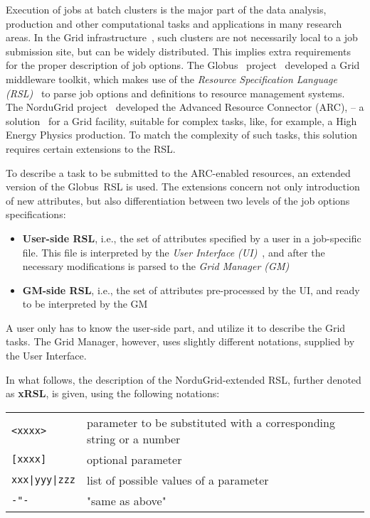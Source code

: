\documentclass{book}
\newcommand{\globus}{Globus\textsuperscript{\textregistered}}
\begin{document}
  Execution of jobs at batch clusters is the major part of the data
  analysis, production and other computational tasks and applications
  in many research areas. In the Grid infrastructure~\cite{grid}, such
  clusters are not necessarily local to a job submission site, but can
  be widely distributed. This implies extra requirements for the
  proper description of job options. The \globus\ 
  project~\cite{globus} developed a Grid middleware toolkit, which
  makes use of the \textit{Resource Specification Language
  (RSL)}~\cite{rsl} to parse job options and definitions to
  resource management systems. The NorduGrid project~\cite{nordugrid}
   developed the Advanced Resource Connector (ARC),
  -- a 
  solution~\cite{para02,acat02} for a Grid facility, suitable for
  complex tasks, like, for example, a High Energy Physics
  production. To match the complexity of such tasks, this solution
  requires certain extensions to the RSL.

  To describe a task to be submitted to the ARC-enabled resources, an
  extended version of the \globus\  RSL is used. The extensions concern
  not only introduction of new attributes, but also differentiation
  between two levels of the job options specifications:

  \begin{itemize}
  \item[] \textbf{User-side RSL}, i.e., the set of attributes
    specified by a user in a job-specific file. This file is
    interpreted by the \textit{User Interface (UI)}~\cite{ui},
     and after the necessary modifications is
    parsed to the \textit{Grid Manager (GM)}~\cite{gm}
  \item[] \textbf{GM-side RSL}, i.e., the set of attributes
    pre-processed by the UI, and ready to be interpreted by the GM
  \end{itemize}

  A user only has to know the user-side part, and utilize it to
  describe the Grid tasks. The Grid Manager, however, uses slightly
  different notations, supplied by the User Interface.

  In what follows, the description of the NorduGrid-extended RSL,
  further denoted as \textbf{xRSL}, is given, using the
  following notations:

  \begin{tabular}{ll}
    \verb#<xxxx>#&parameter to be substituted with a corresponding string or a number\\
    \verb#[xxxx]# & optional parameter\\
    \verb#xxx|yyy|zzz# &list of possible values of a parameter\\
    \verb#-"-# &"same as above"\\
  \end{tabular}
\end{document}
